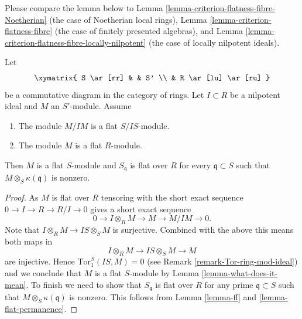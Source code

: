 \noindent
Please compare the lemma below to
Lemma \ref{lemma-criterion-flatness-fibre-Noetherian}
(the case of Noetherian local rings),
Lemma \ref{lemma-criterion-flatness-fibre}
(the case of finitely presented algebras), and
Lemma \ref{lemma-criterion-flatness-fibre-locally-nilpotent}
(the case of locally nilpotent ideals).

\begin{lemma}
\label{lemma-criterion-flatness-fibre-nilpotent}
Let
$$
\xymatrix{
S \ar[rr] & & S' \\
& R \ar[lu] \ar[ru]
}
$$
be a commutative diagram in the category of rings.
Let $I \subset R$ be a nilpotent ideal and $M$ an $S'$-module. Assume
\begin{enumerate}
\item The module $M/IM$ is a flat $S/IS$-module.
\item The module $M$ is a flat $R$-module.
\end{enumerate}
Then $M$ is a flat $S$-module and $S_{\mathfrak q}$ is flat over $R$
for every $\mathfrak q \subset S$ such that $M \otimes_S \kappa(\mathfrak q)$
is nonzero.
\end{lemma}

\begin{proof}
As $M$ is flat over $R$ tensoring with the short exact
sequence $0 \to I \to R \to R/I \to 0$ gives a short exact sequence
$$
0 \to I \otimes_R M \to M \to M/IM \to 0.
$$
Note that $I \otimes_R M \to IS \otimes_S M$ is surjective. Combined with
the above this means both maps in
$$
I \otimes_R M \to IS \otimes_S M \to M
$$
are injective. Hence $\text{Tor}_1^S(IS, M) = 0$ (see
Remark \ref{remark-Tor-ring-mod-ideal})
and we conclude that $M$ is a flat $S$-module by
Lemma \ref{lemma-what-does-it-mean}.
To finish we need to show that $S_{\mathfrak q}$ is flat over
$R$ for any prime $\mathfrak q \subset S$ such that
$M \otimes_S \kappa(\mathfrak q)$ is nonzero. This follows from
Lemma \ref{lemma-ff} and \ref{lemma-flat-permanence}.
\end{proof}








